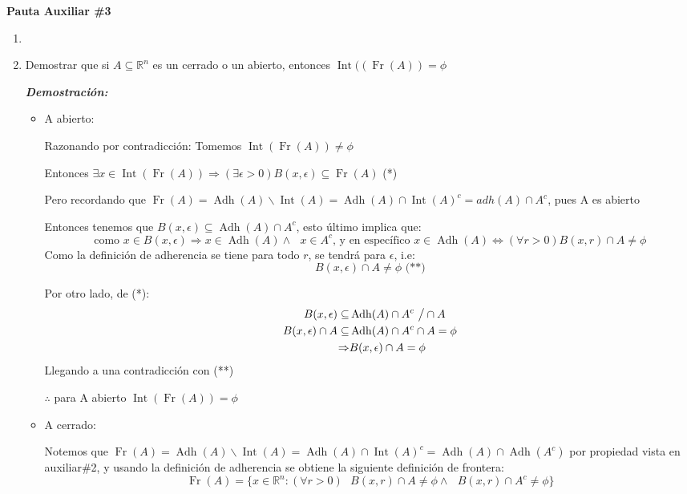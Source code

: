 \documentclass[letterpaper,10pt]{article}
\DeclareMathOperator{\inte}{Int}
\DeclareMathOperator{\adh}{Adh}
\DeclareMathOperator{\fr}{Fr}
\newcommand{\dem}{\textbf{\emph{Demostraci\'on: }}}
\begin{document}
\begin{center}
	\LARGE \bf{Pauta Auxiliar \#3}\\
\end{center}

\vspace{-1cm}
\begin{enumerate}\setlength{\itemsep}{0.4cm}	
\item[]

\item Demostrar que si $A\subseteq \mathbb{R}^n $ es un cerrado o un abierto, entonces $\inte((\fr(A))=\phi$

\dem

\begin{itemize}
    \item A abierto:
    
    Razonando por contradicción: Tomemos $\inte(\fr(A))\neq\phi$
    
    Entonces $\exists x\in\inte(\fr(A))\Rightarrow (\exists \epsilon>0) B(x,\epsilon)\subseteq \fr(A)$ (*)
    
    Pero recordando que $\fr(A)=\adh(A)\backslash\inte(A)=\adh(A)\cap\inte(A)^c=adh(A)\cap A^c$, pues A es abierto 
    
    Entonces tenemos que $ B(x,\epsilon)\subseteq\adh(A)\cap A^c$, esto último implica que: $$\text{como } x\in B(x,\epsilon)\Rightarrow x\in\adh(A) \wedge \text{ }x\in A^c \text{, y en específico } x\in\adh(A)\Leftrightarrow (\forall r>0) B(x,r)\cap A\neq \phi$$
    Como la definición de adherencia se tiene para todo $r$, se tendrá para $\epsilon$, i.e: 
    $$B(x,\epsilon)\cap A\neq\phi \text{ (**)}$$ 
    
    Por otro lado, de (*): 
    \begin{align*}
        B(x,\epsilon)\subseteq&\adh(A)\cap A^c \text{  }\big{\slash}\cap A\\
        B(x,\epsilon)\cap A\subseteq&\adh(A)\cap A^c\cap A=\phi\\
        \Rightarrow& B(x,\epsilon)\cap A=\phi
    \end{align*}
    Llegando a una contradicción con (**)
    
    $\therefore$ para A abierto $\inte(\fr(A))=\phi$
    
    \item A cerrado:
    
    Notemos que $\fr(A)=\adh(A)\backslash\inte(A)=\adh(A)\cap\inte(A)^c=\adh(A)\cap\adh(A^c)$ por propiedad vista en auxiliar\#2, y usando la definición de adherencia se obtiene la siguiente definición de frontera:
    \[\fr(A)=\{x\in \mathbb{R}^n: (\forall r>0)\text{ } B(x,r)\cap A\neq\phi \wedge \text{ } B(x,r)\cap A^c\neq\phi\}\]
    

\end{itemize}
\end{enumerate}
\end{document}
